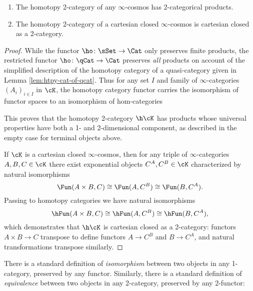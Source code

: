   \begin{proposition}\label{prop:htpy-2-cat-closure}
  $\quad$
  \begin{enumerate}
  \item The homotopy 2-category of any $\infty$-cosmos has 2-categorical products.
  \item\label{itm:cart-closed} The homotopy 2-category of a cartesian closed $\infty$-cosmos is cartesian closed as a 2-category.
  \end{enumerate}
  \end{proposition}
  \begin{proof}
  While the functor $\ho\colon\sSet \to \Cat$ only preserves finite products, the restricted functor $\ho\colon\qCat\to\Cat$ preserves \emph{all} products on account of the simplified description of the homotopy category of a quasi-category given in Lemma \ref{lem:htpy-cat-of-qcat}. Thus for any set $I$ and family of $\infty$-categories $(A_i)_{i \in I}$ in $\cK$, the homotopy category functor carries the isomorphism of functor spaces  to an isomorphism of hom-categories
  \begin{center} 
  \end{center}
  This proves that the homotopy 2-category $\h\cK$ has products whose universal properties have both a 1- and 2-dimensional component, as described in the empty case for terminal objects above.

  If $\cK$ is a cartesian closed $\infty$-cosmos, then for any triple of $\infty$-categories $A,B,C \in \cK$ there exist exponential objects $C^A, C^B \in \cK$ characterized by natural isomorphisms
  \[ \Fun(A \times B, C) \cong \Fun(A, C^B) \cong \Fun(B,C^A).\] Passing to homotopy categories we have natural isomorphisms
  \[ \hFun(A \times B, C) \cong \hFun(A, C^B) \cong \hFun(B,C^A),\] which demonstrates that $\h\cK$ is cartesian closed as a 2-category: functors $A \times B \to C$ transpose to define functors $A \to C^B$ and $B \to C^A$, and natural transformations transpose similarly.
  \end{proof}

  There is a standard definition of \emph{isomorphism} between two objects in any 1-category, preserved by any functor. Similarly, there is a standard definition of \emph{equivalence} between two objects in any 2-category, preserved by any 2-functor:

